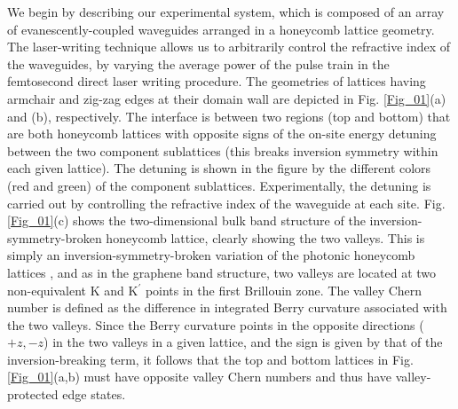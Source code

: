 \documentclass[prl,twocolumn,showpacs,amsmath,amssymb,superscriptaddress]{revtex4-1}
\begin{document}
We begin by describing our experimental system, which is composed of an array of evanescently-coupled waveguides arranged in a honeycomb lattice geometry.
The laser-writing technique allows us to arbitrarily control the refractive index of the waveguides, by varying the average power of the pulse train in the femtosecond direct laser writing procedure.
The geometries of lattices having armchair and zig-zag edges at their domain wall are depicted in Fig. \ref{Fig_01}(a) and (b), respectively.
The interface is between two regions (top and bottom) that are both honeycomb lattices with opposite signs of the on-site energy detuning between the two component sublattices (this breaks inversion symmetry within each given lattice).
The detuning is shown in the figure by the different colors (red and green) of the component sublattices.
Experimentally, the detuning is carried out by controlling the refractive index of the waveguide at each site.
Fig. \ref{Fig_01}(c) shows the two-dimensional bulk band structure of the inversion-symmetry-broken honeycomb lattice, clearly showing the two valleys.
This is simply an inversion-symmetry-broken variation of the photonic honeycomb lattices \cite{Peleg2007,Bahat-Treidel2008,Plotnik2013}, and as in the graphene band structure, two valleys are located at two non-equivalent K and K$^{\prime}$ points in the first Brillouin zone.
The valley Chern number is defined as the difference in integrated Berry curvature associated with the two valleys.
Since the Berry curvature points in the opposite directions ($+z,-z$) in the two valleys in a given lattice, and the sign is given by that of the inversion-breaking term, it follows that the top and bottom lattices in Fig. \ref{Fig_01}(a,b) must have opposite valley Chern numbers and thus have valley-protected edge states.  
\end{document}
